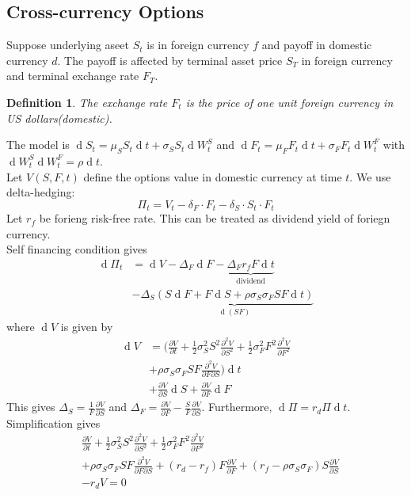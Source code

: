 \documentclass[12pt]{article}
\newtheorem{definition}{Definition}[section]
\theoremstyle{definition}
\DeclareMathOperator{\diff}{d}
\begin{document}
\subsection{Cross-currency Options}
Suppose underlying aseet $S_t$ is in foreign currency $f$ and payoff in domestic currency $d$. The payoff is affected by terminal asset price $S_T$ in foreign currency and terminal exchange rate $F_T$.\\
\begin{definition}\normalfont The exchange rate $F_t$ is the price of one unit foreign currency in US dollars(domestic).\end{definition}
The model is $\diff S_t=\mu_S S_t\diff t+\sigma_S S_t\diff W_t^S$ and $\diff F_t=\mu_F F_t\diff t+\sigma_F F_t\diff W_t^F$ with $\diff W_t^S\diff W_t^F=\rho\diff t$.\\
Let $V(S,F,t)$ define the options value in domestic currency at time $t$. We use delta-hedging:
\[
\Pi_t=V_t-\delta_F\cdot F_t-\delta_S\cdot S_t\cdot F_t
\]
Let $r_f$ be forieng risk-free rate. This can be treated as dividend yield of foriegn currency.\\
Self financing condition gives
\begin{align*}
\diff \Pi_t&=\diff V-\Delta_F\diff F-\underbrace{\Delta_F r_f F\diff t}_{\text{dividend}}\\&-\Delta_S\underbrace{(S\diff F+ F\diff S+\rho\sigma_S\sigma_F SF\diff t)}_{\diff(SF)}
\end{align*}
where $\diff V$ is given by
\begin{align*}
\diff V&=(\frac{\partial V}{\partial t}+\frac{1}{2}\sigma_S^2S^2\frac{\partial^2 V}{\partial S^2}+\frac{1}{2}\sigma_F^2 F^2\frac{\partial^2 V}{\partial F^2}\\&+\rho\sigma_S\sigma_F SF\frac{\partial^2 V}{\partial F\partial S})\diff t\\
&+\frac{\partial V}{\partial S}\diff S+\frac{\partial V}{\partial F}\diff F
\end{align*}
This gives $\Delta_S=\frac{1}{F}\frac{\partial V}{\partial S}$ and $\Delta_F=\frac{\partial V}{\partial F}-\frac{S}{F}\frac{\partial V}{\partial S}$. Furthermore, $\diff \Pi = r_d\Pi\diff t$. Simplification gives
\begin{align*}
&\frac{\partial V}{\partial t}+\frac{1}{2}\sigma_S^2S^2\frac{\partial^2 V}{\partial S^2}+\frac{1}{2}\sigma_F^2 F^2\frac{\partial^2 V}{\partial F^2}\\&+\rho\sigma_S\sigma_F SF\frac{\partial^2 V}{\partial F\partial S}+(r_d-r_f)F\frac{\partial V}{\partial F}+(r_f-\rho\sigma_S\sigma_F)S\frac{\partial V}{\partial S}\\&-r_dV=0
\end{align*}
\end{document}
